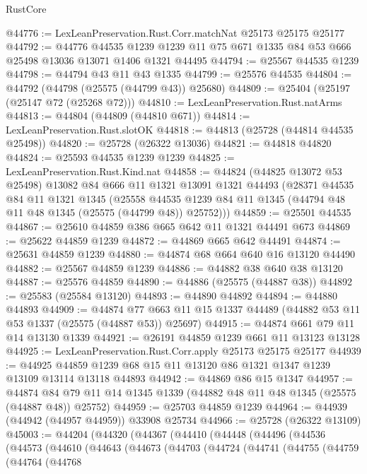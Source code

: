 \begin{lexlean}{RustCore}
\begin{coremodule}
@44776 := LexLeanPreservation.Rust.Corr.matchNat @25173 @25175 @25177
@44792 := @44776
    @44535
    @1239
    @1239
    @11
    @75
    @671
    @1335
    @84
    @53
    @666
    @25498
    @13036
    @13071
    @1406
    @1321
    @44495
@44794 := @25567 @44535 @1239
@44798 := @44794 @43 @11 @43 @1335
@44799 := @25576 @44535
@44804 := @44792 (@44798 (@25575 (@44799 @43)) @25680)
@44809 := @25404 (@25197 (@25147 @72 (@25268 @72)))
@44810 := LexLeanPreservation.Rust.natArms
@44813 := @44804 (@44809 (@44810 @671))
@44814 := LexLeanPreservation.Rust.slotOK
@44818 := @44813 (@25728 (@44814 @44535 @25498))
@44820 := @25728 (@26322 @13036)
@44821 := @44818 @44820
@44824 := @25593 @44535 @1239 @1239
@44825 := LexLeanPreservation.Rust.Kind.nat
@44858 := @44824
    (@44825 @13072 @53 @25498)
    @13082
    @84
    @666
    @11
    @1321
    @13091
    @1321
    @44493
    (@28371
      @44535
      @84
      @11
      @1321
      @1345
      (@25558 @44535 @1239 @84 @11 @1345 (@44794 @48 @11 @48 @1345 (@25575 (@44799 @48)) @25752)))
@44859 := @25501 @44535
@44867 := @25610 @44859 @386 @665 @642 @11 @1321 @44491 @673
@44869 := @25622 @44859 @1239
@44872 := @44869 @665 @642 @44491
@44874 := @25631 @44859 @1239
@44880 := @44874 @68 @664 @640 @16 @13120 @44490
@44882 := @25567 @44859 @1239
@44886 := @44882 @38 @640 @38 @13120
@44887 := @25576 @44859
@44890 := @44886 (@25575 (@44887 @38))
@44892 := @25583 (@25584 @13120)
@44893 := @44890 @44892
@44894 := @44880 @44893
@44909 := @44874
    @77
    @663
    @11
    @15
    @1337
    @44489
    (@44882 @53 @11 @53 @1337 (@25575 (@44887 @53)) @25697)
@44915 := @44874 @661 @79 @11 @14 @13130 @1339
@44921 := @26191 @44859 @1239 @661 @11 @13123 @13128
@44925 := LexLeanPreservation.Rust.Corr.apply @25173 @25175 @25177
@44939 := @44925 @44859 @1239 @68 @15 @11 @13120 @86 @1321 @1347 @1239 @13109 @13114 @13118 @44893
@44942 := @44869 @86 @15 @1347
@44957 := @44874 @84 @79 @11 @14 @1345 @1339 (@44882 @48 @11 @48 @1345 (@25575 (@44887 @48)) @25752)
@44959 := @25703 @44859 @1239
@44964 := @44939 (@44942 (@44957 @44959)) @33908 @25734
@44966 := @25728 (@26322 @13109)
@45003 := @44204
    (@44320
      (@44367
        (@44410
          (@44448
            (@44496
              (@44536
                (@44573
                  (@44610
                    (@44643
                      (@44673
                        (@44703
                          (@44724
                            (@44741
                              (@44755
                                (@44759
                                  (@44764
                                    (@44768

\end{coremodule}
\end{lexlean}
